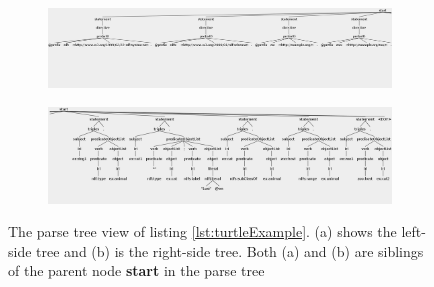 \begin{figure}

	\begin{subfigure}[]{}
		\centering\includegraphics[width=1\linewidth]{images/parseTreeAllLeft.png}
	\end{subfigure}     
		\centering
	\begin{subfigure}[]{}
		\centering\includegraphics[width=1\linewidth]{images/parseTreeAlRight.png}
		\label{fig:rightSideParseTree}
	\end{subfigure}
	\caption{The parse tree view of listing \ref{lst:turtleExample}. (a) shows the left-side tree and (b) is the right-side tree. Both (a) and (b) are siblings of the parent node \textbf{start} in the parse tree  }
	\label{Fig:parseTreeTAll}
\end{figure}



